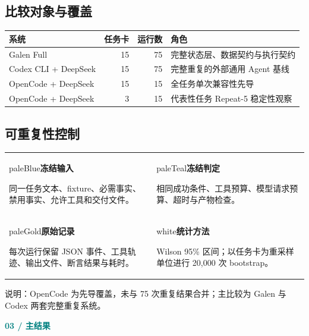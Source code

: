 \documentclass[UTF8,11pt,a4paper]{ctexart}
\newcommand{\kicker}[1]{\textcolor{teal}{\sffamily\bfseries\small #1}\par\vspace{1mm}}
\begin{document}
\subsection*{比较对象与覆盖}
\begin{tabularx}{\textwidth}{@{}Y r r Y@{}}
\toprule
\textbf{系统} & \textbf{任务卡} & \textbf{运行数} & \textbf{角色}\\
\midrule
Galen Full & 15 & 75 & 完整状态层、数据契约与执行契约\\
Codex CLI + DeepSeek & 15 & 75 & 完整重复的外部通用 Agent 基线\\
OpenCode + DeepSeek & 15 & 15 & 全任务单次兼容性先导\\
OpenCode + DeepSeek & 3 & 15 & 代表性任务 Repeat-5 稳定性观察\\
\bottomrule
\end{tabularx}
\subsection*{可重复性控制}
\begin{tabularx}{\textwidth}{@{}Y Y@{}}
\begin{card}{paleBlue}\textbf{冻结输入}\par 同一任务文本、fixture、必需事实、禁用事实、允许工具和交付文件。\end{card}&
\begin{card}{paleTeal}\textbf{冻结判定}\par 相同成功条件、工具预算、模型请求预算、超时与产物检查。\end{card}\\
\begin{card}{paleGold}\textbf{原始记录}\par 每次运行保留 JSON 事件、工具轨迹、输出文件、断言结果与耗时。\end{card}&
\begin{card}{white}\textbf{统计方法}\par Wilson 95\% 区间；以任务卡为重采样单位进行 20,000 次 bootstrap。\end{card}
\end{tabularx}
\small\color{muted}说明：OpenCode 为先导覆盖，未与 75 次重复结果合并；主比较为 Galen 与 Codex 两套完整重复系统。\color{ink}
\clearpage

\kicker{03  /  主结果}
\end{document}
